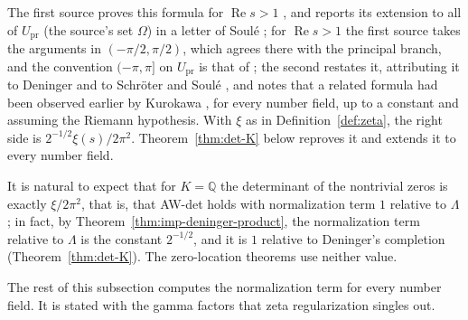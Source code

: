 \documentclass[11pt]{amsart}
\theoremstyle{plain}
\theoremstyle{definition}
\theoremstyle{remark}
\numberwithin{equation}{section}
\newcommand{\Q}{\mathbb{Q}}
\DeclareMathOperator{\Rea}{Re}
\renewcommand{\Re}{\Rea}
\begin{document}
The first source proves this formula for $\Re s>1$
\cite[Theorem~3.3, p.~147]{Deninger1992Local}, and reports its
extension to all of $U_{\mathrm{pr}}$ (the source's set $\Omega$) in a
letter of Soul\'e \cite[Remark~3.4(1), p.~147]{Deninger1992Local};
for $\Re s>1$ the first source takes the arguments in $(-\pi/2,\pi/2)$,
which agrees there with the principal branch, and the convention
$(-\pi,\pi]$ on $U_{\mathrm{pr}}$ is that of
\cite[p.~167]{Deninger1998Analogies};
the second restates it, attributing it to Deninger and to Schr\"oter and
Soul\'e \cite{SchroeterSoule1994Deninger}, and notes that a related
formula had been observed earlier by Kurokawa
\cite[p.~24]{Kurokawa1988Parabolic}, for every number field, up to a
constant and assuming the Riemann hypothesis.
With $\xi$ as in Definition~\ref{def:zeta}, the right side is
$2^{-1/2}\xi(s)/2\pi^2$. Theorem~\ref{thm:det-K} below reproves it and
extends it to every number field.

It is natural to expect that for $K=\Q$ the determinant of the
nontrivial zeros is exactly $\xi/2\pi^2$, that is, that AW-det holds
with normalization term $1$ relative to $\Lambda$; in fact, by
Theorem~\ref{thm:imp-deninger-product}, the normalization term
relative to $\Lambda$ is the constant $2^{-1/2}$, and it is $1$
relative to Deninger's completion (Theorem~\ref{thm:det-K}). The
zero-location theorems use neither value.

The rest of this subsection computes the normalization term for every
number field. It is stated with the gamma factors that zeta
regularization singles out.
\end{document}
